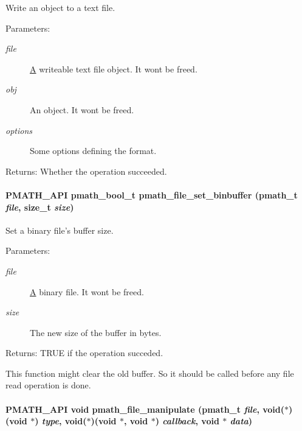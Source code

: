 Write an object to a text file. 

\begin{Desc}
\item[Parameters:]
\begin{description}
\item[{\em file}]\hyperlink{class_a}{A} writeable text file object. It wont be freed. \item[{\em obj}]An object. It wont be freed. \item[{\em options}]Some options defining the format. \end{description}
\end{Desc}
\begin{Desc}
\item[Returns:]Whether the operation succeeded. \end{Desc}
\hypertarget{group__file__api_g7f852f3c8057a535541fbf64f75940d2}{
\paragraph[{pmath\_\-file\_\-set\_\-binbuffer}]{\setlength{\rightskip}{0pt plus 5cm}PMATH\_\-API {\bf pmath\_\-bool\_\-t} pmath\_\-file\_\-set\_\-binbuffer ({\bf pmath\_\-t} {\em file}, \/  size\_\-t {\em size})}\hfill}
\label{group__file__api_g7f852f3c8057a535541fbf64f75940d2}


Set a binary file's buffer size. 

\begin{Desc}
\item[Parameters:]
\begin{description}
\item[{\em file}]\hyperlink{class_a}{A} binary file. It wont be freed. \item[{\em size}]The new size of the buffer in bytes. \end{description}
\end{Desc}
\begin{Desc}
\item[Returns:]TRUE if the operation succeded.\end{Desc}
This function might clear the old buffer. So it should be called before any file read operation is done. \hypertarget{group__file__api_ga286dc02f8ee28ee0b3fcfa302ae7982}{
\paragraph[{pmath\_\-file\_\-manipulate}]{\setlength{\rightskip}{0pt plus 5cm}PMATH\_\-API void pmath\_\-file\_\-manipulate ({\bf pmath\_\-t} {\em file}, \/  void($\ast$)(void $\ast$) {\em type}, \/  void($\ast$)(void $\ast$, void $\ast$) {\em callback}, \/  void $\ast$ {\em data})}\hfill}
\label{group__file__api_ga286dc02f8ee28ee0b3fcfa302ae7982}


